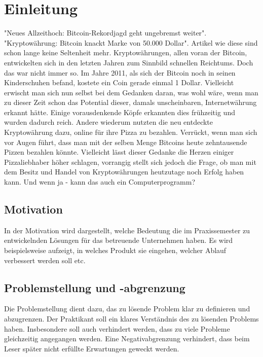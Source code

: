 \documentclass[oneside]{ausarbeitung}
\begin{document}
\cleardoublepage
{}
\setcounter{page}{1}

\chapter{Einleitung}
\label{cha:einleitung}

"Neues Allzeithoch: Bitcoin-Rekordjagd geht ungebremst weiter".\cite{bitcoin_artikel_1} "Kryptowährung: Bitcoin knackt Marke von 50.000 Dollar".\cite{bitcoin_artikel_2} Artikel wie diese sind schon lange keine Seltenheit mehr. Kryptowährungen, allen voran der Bitcoin, entwickelten sich in den letzten Jahren zum Sinnbild schnellen Reichtums. Doch das war nicht immer so. Im Jahre 2011, als sich der Bitcoin noch in seinen Kinderschuhen befand, kostete ein Coin gerade einmal 1 Dollar.\cite{bitcoin_kurs_2011} Vielleicht erwischt man sich nun selbst bei dem Gedanken daran, was wohl wäre, wenn man zu dieser Zeit schon das Potential dieser, damals unscheinbaren, Internetwährung erkannt hätte. Einige vorausdenkende Köpfe erkannten dies frühzeitig und wurden dadurch reich. Andere wiederum nutzten die neu entdeckte Kryptowährung dazu, online für ihre Pizza zu bezahlen. Verrückt, wenn man sich vor Augen führt, dass man mit der selben Menge Bitcoins heute zehntausende Pizzen bezahlen könnte. Vielleicht lässt dieser Gedanke die Herzen einiger Pizzaliebhaber höher schlagen, vorrangig stellt sich jedoch die Frage, ob man mit dem Besitz und Handel von Kryptowährungen heutzutage noch Erfolg haben kann. Und wenn ja - kann das auch ein Computerprogramm?

\section{Motivation}
\label{sec:motivation}



In der Motivation wird dargestellt, welche Bedeutung die im 
Praxissemester zu entwickelnden Lösungen für das betreuende Unternehmen 
haben. Es wird beispielsweise aufzeigt, in welches Produkt sie eingehen, 
welcher Ablauf verbessert werden soll etc.

\section{Problemstellung und -abgrenzung}
\label{sec:problemstellung}

Die Problemstellung dient dazu, das zu lösende Problem klar zu 
definieren und abzugrenzen. Der Praktikant soll ein klares Verständnis 
des zu lösenden Problems haben. Insbesondere soll auch verhindert 
werden, dass zu viele Probleme gleichzeitig angegangen werden. Eine 
Negativabgrenzung verhindert, dass beim Leser später nicht erfüllte 
Erwartungen geweckt werden.
\end{document}
